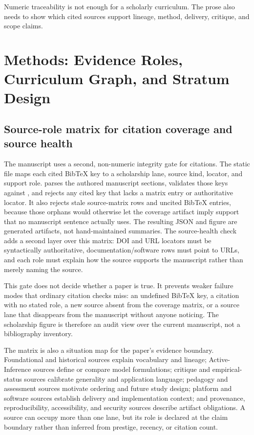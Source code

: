 \documentclass[
  english,
]{article}
\begin{document}
Numeric traceability is not enough for a scholarly curriculum. The prose
also needs to show which cited sources support lineage, method,
delivery, critique, and scope claims.

\newpage

\section{Methods: Evidence Roles, Curriculum Graph, and Stratum
Design}\label{sec:methodology-scholarship-curriculum-strata}

\subsection{Source-role matrix for citation coverage and source
health}\label{source-role-matrix-for-citation-coverage-and-source-health}

The manuscript uses a second, non-numeric integrity gate for citations.
The static  file maps each cited
BibTeX key to a scholarship lane, source kind, locator, and support
role.  parses the authored
manuscript sections, validates those keys against
, and rejects any cited key that lacks
a matrix entry or authoritative locator. It also rejects stale
source-matrix rows and uncited BibTeX entries, because those orphans
would otherwise let the coverage artifact imply support that no
manuscript sentence actually uses. The resulting JSON and figure are
generated artifacts, not hand-maintained summaries. The source-health
check adds a second layer over this matrix: DOI and URL locators must be
syntactically authoritative, documentation/software rows must point to
URLs, and each role must explain how the source supports the manuscript
rather than merely naming the source.

This gate does not decide whether a paper is true. It prevents weaker
failure modes that ordinary citation checks miss: an undefined BibTeX
key, a citation with no stated role, a new source absent from the
coverage matrix, or a source lane that disappears from the manuscript
without anyone noticing. The scholarship figure is therefore an audit
view over the current manuscript, not a bibliography inventory.

The matrix is also a situation map for the paper's evidence boundary.
Foundational and historical sources explain vocabulary and lineage;
Active-Inference sources define or compare model formulations; critique
and empirical-status sources calibrate generality and application
language; pedagogy and assessment sources motivate ordering and future
study design; platform and software sources establish delivery and
implementation context; and provenance, reproducibility, accessibility,
and security sources describe artifact obligations. A source can occupy
more than one lane, but its role is declared at the claim boundary
rather than inferred from prestige, recency, or citation count.
\end{document}
